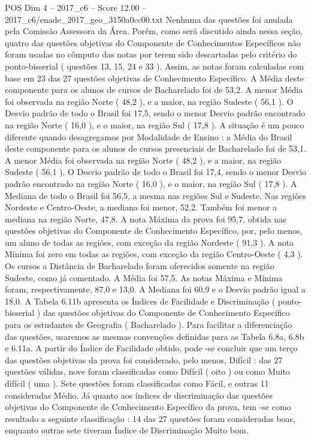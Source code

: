 \begin{textsample}{POS Dim 4 – 2017\_c6 – Score 12.00 – 2017\_c6/enade\_2017\_geo\_3150a0cc00.txt}
Nenhuma das questões foi anulada pela Comissão Assessora da Área.
Porém, como será discutido ainda nessa seção, quatro das questões objetivas do Componente de Conhecimentos Específicos não foram usadas no cômputo das notas por terem sido descartadas pelo critério do ponto-bisserial ( questões 13, 15, 24 e 33 ).
Assim, as notas foram calculadas com base em 23 das 27 questões objetivas de Conhecimento Específico.
A Média deste componente para os alunos de cursos de Bacharelado foi de 53,2.
A menor Média foi observada na região Norte ( 48,2 ), e a maior, na região Sudeste ( 56,1 ).
O Desvio padrão de todo o Brasil foi 17,5, sendo o menor Desvio padrão encontrado na região Norte ( 16,0 ), e o maior, na região Sul ( 17,8 ).
A situação é um pouco diferente quando desagregamos por Modalidade de Ensino : a Média do Brasil deste componente para os alunos de cursos presenciais de Bacharelado foi de 53,1.
A menor Média foi observada na região Norte ( 48,2 ), e a maior, na região Sudeste ( 56,1 ).
O Desvio padrão de todo o Brasil foi 17,4, sendo o menor Desvio padrão encontrado na região Norte ( 16,0 ), e o maior, na região Sul ( 17,8 ).
A Mediana de todo o Brasil foi 56,5, a mesma nas regiões Sul e Sudeste.
Nas regiões Nordeste e Centro-Oeste, a mediana foi menor, 52,2.
Também foi menor a mediana na região Norte, 47,8.
A nota Máxima da prova foi 95,7, obtida nas questões objetivas do Componente de Conhecimento Específico, por, pelo menos, um aluno de todas as regiões, com exceção da região Nordeste ( 91,3 ).
A nota Mínima foi zero em todas as regiões, com exceção da região Centro-Oeste ( 4,3 ).
Os cursos a Distância de Bacharelado foram oferecidos somente na região Sudeste, como já comentado.
A Média foi 57,5.
As notas Máxima e Mínima foram, respectivamente, 87,0 e 13,0.
A Mediana foi 60,9 e o Desvio padrão igual a 18,0.
A Tabela 6.11b apresenta os Índices de Facilidade e Discriminação ( ponto-bisserial ) das questões objetivas do Componente de Conhecimento Específico para os estudantes de Geografia ( Bacharelado ).
Para facilitar a diferenciação das questões, usaremos as mesmas convenções definidas para as Tabela 6.8a, 6.8b e 6.11a.
A partir do Índice de Facilidade obtido, pode -se concluir que um terço das questões objetivas da prova foi considerado, pelo menos, Difícil : das 27 questões válidas, nove foram classificadas como Difícil ( oito ) ou como Muito difícil ( uma ).
Sete questões foram classificadas como Fácil, e outras 11 consideradas Médio.
Já quanto aos índices de discriminação das questões objetivas do Componente de Conhecimento Específico da prova, tem -se como resultado a seguinte classificação : 14 das 27 questões foram consideradas boas, enquanto outras sete tiveram Índice de Discriminação Muito bom.

\end{textsample}
